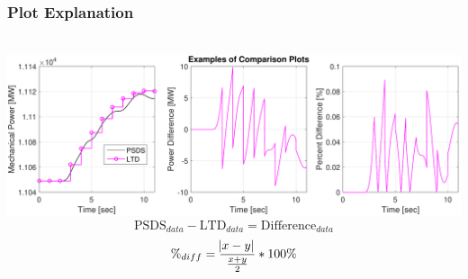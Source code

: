 \documentclass[14pt, unknownkeysallowed]{beamer}
\begin{document}
\begin{frame}
\frametitle{Plot Explanation}\ \\
\vspace{.25em}
		\includegraphics[width=\linewidth]{comparisonPlotsExp} 
		{\footnotesize
		\[\text{PSDS}_{data}-\text{LTD}_{data} = \text{Difference}_{data}\]
		\[\%_{diff} = \dfrac{\abs{x-y}}{\frac{x+y}{2}}*100\% \]}
\end{frame}
\end{document}
